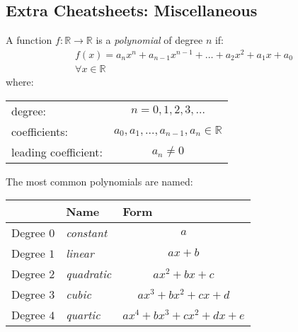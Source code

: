 \subsection{Extra Cheatsheets: Miscellaneous}%
\label{sub:extrasecmath-cheatsheet-misc}

\begin{multicols}{2}

    \begin{CheatsheetEntryFrame}


        A function $f : \mathbb{R} \to \mathbb{R}$ is a \textit{polynomial} of degree $n$ if:
        \begin{gather*}
            f(x) = a_n x^n + a_{n-1} x^{n-1} + \dots + a_2 x^2 + a_1 x + a_0 \\
            \forall x \in \mathbb{R} %
        \end{gather*}
        where:
        \begin{center}
        \begin{tabular}{lc}
            degree: & $n = 0, 1, 2, 3, \dots$ \\
            coefficients: & $a_0, a_1, \dots, a_{n-1}, a_n \in \mathbb{R}$ \\
            leading coefficient: & $a_n \ne 0$ \\
        \end{tabular}
        \end{center}
        \vspace{\parskip}

        The most common polynomials are named:
        \begin{center}
        \begin{tabular}{|c|l|c|}
            \cline{2-3}
            \multicolumn{1}{c|}{} & Name & \multicolumn{1}{l|}{Form} \\ \hline
            Degree $0$ & \textit{constant}  & $a$ \\
            Degree $1$ & \textit{linear}    & $a x   + b$ \\
            Degree $2$ & \textit{quadratic} & $a x^2 + b x   + c$ \\
            Degree $3$ & \textit{cubic}     & $a x^3 + b x^2 + c x   + d$ \\
            Degree $4$ & \textit{quartic}   & $a x^4 + b x^3 + c x^2 + d x + e$ \\ \hline
        \end{tabular}
        \end{center}
        \vspace{\parskip}


\end{CheatsheetEntryFrame}
\end{multicols}
